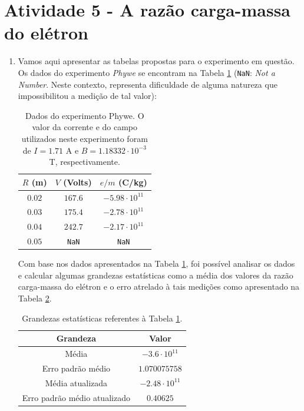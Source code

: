 \documentclass[12pt,a4paper]{article}
\begin{document}
\section*{Atividade 5 - A razão carga-massa do elétron}
    \begin{enumerate}
        \item Vamos aqui apresentar as tabelas propostas para o experimento em questão. Os dados do experimento \textit{Phywe} se encontram na Tabela \ref{tab:Atividade5-1} (\texttt{NaN}: \textit{Not a Number}. Neste contexto, representa dificuldade de alguma natureza que impossibilitou a medição de tal valor):        
        \begin{table}[htb!]
        \centering
        \caption{Dados do experimento Phywe. O valor da corrente e do campo utilizados neste experimento foram de $I=1.71$ A e $B=1.18332\cdot10^{-3}$ T, respectivamente.}
        \begin{tabular}{|c|c|c|}
            \hline
            $R$ (m) & $V$ (Volts) & $e/m$ (C/kg) \\
            \hline
            $0.02$ & $167.6$ & $-5.98\cdot10^{11}$ \\
            $0.03$ & $175.4$ & $-2.78\cdot10^{11}$ \\
            $0.04$ & $242.7$ & $-2.17\cdot10^{11}$ \\
            $0.05$ & \texttt{NaN} & \texttt{NaN} \\
            \hline
        \end{tabular}
        \label{tab:Atividade5-1}
    \end{table}

    Com base nos dados apresentados na Tabela \ref{tab:Atividade5-1}, foi possível analisar os dados e calcular algumas grandezas estatísticas como a média dos valores da razão carga-massa do elétron e o erro atrelado à tais medições como apresentado na Tabela \ref{tab:Atividade5-2}.

    \begin{table}[htb!]
        \centering
        \caption{Grandezas estatísticas referentes à Tabela \ref{tab:Atividade5-1}.}
        \begin{tabular}{|c|c|}
            \hline
            Grandeza & Valor \\
            \hline
            Média & $-3.6\cdot10^{11}$ \\
            Erro padrão médio & $1.070075758$ \\
            Média atualizada & $-2.48\cdot10^{11}$ \\
            Erro padrão médio atualizado & $0.40625$ \\
            \hline
        \end{tabular}
        \label{tab:Atividade5-2}
    \end{table}


\end{enumerate}
\end{document}
